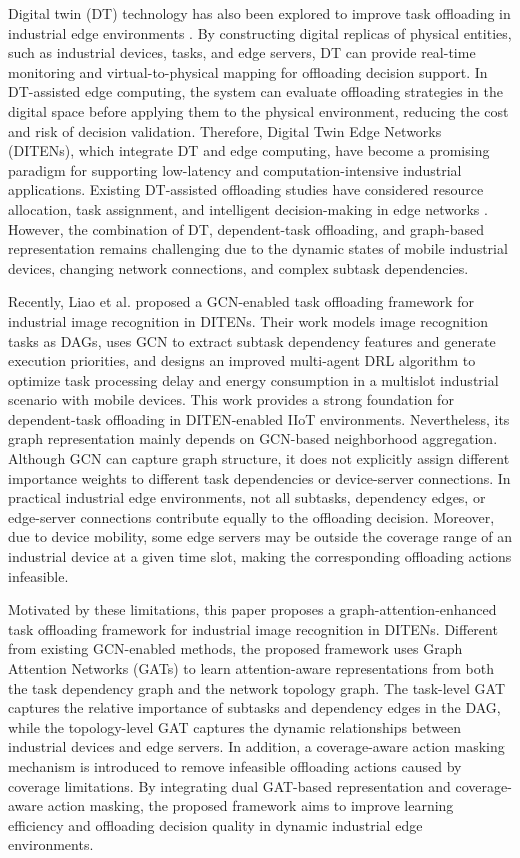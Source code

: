 \documentclass[conference]{IEEEtran}
\begin{document}
Digital twin (DT) technology has also been explored to improve task offloading in industrial edge environments \cite{10089851}. By constructing digital replicas of physical entities, such as industrial devices, tasks, and edge servers, DT can provide real-time monitoring and virtual-to-physical mapping for offloading decision support. In DT-assisted edge computing, the system can evaluate offloading strategies in the digital space before applying them to the physical environment, reducing the cost and risk of decision validation. Therefore, Digital Twin Edge Networks (DITENs), which integrate DT and edge computing, have become a promising paradigm for supporting low-latency and computation-intensive industrial applications. Existing DT-assisted offloading studies have considered resource allocation, task assignment, and intelligent decision-making in edge networks \cite{10680286,10062583}. However, the combination of DT, dependent-task offloading, and graph-based representation remains challenging due to the dynamic states of mobile industrial devices, changing network connections, and complex subtask dependencies.

Recently, Liao et al. \cite{10892268} proposed a GCN-enabled task offloading framework for industrial image recognition in DITENs. Their work models image recognition tasks as DAGs, uses GCN to extract subtask dependency features and generate execution priorities, and designs an improved multi-agent DRL algorithm to optimize task processing delay and energy consumption in a multislot industrial scenario with mobile devices. This work provides a strong foundation for dependent-task offloading in DITEN-enabled IIoT environments. Nevertheless, its graph representation mainly depends on GCN-based neighborhood aggregation. Although GCN can capture graph structure, it does not explicitly assign different importance weights to different task dependencies or device-server connections. In practical industrial edge environments, not all subtasks, dependency edges, or edge-server connections contribute equally to the offloading decision. Moreover, due to device mobility, some edge servers may be outside the coverage range of an industrial device at a given time slot, making the corresponding offloading actions infeasible.

Motivated by these limitations, this paper proposes a graph-attention-enhanced task offloading framework for industrial image recognition in DITENs. Different from existing GCN-enabled methods, the proposed framework uses Graph Attention Networks (GATs) to learn attention-aware representations from both the task dependency graph and the network topology graph. The task-level GAT captures the relative importance of subtasks and dependency edges in the DAG, while the topology-level GAT captures the dynamic relationships between industrial devices and edge servers. In addition, a coverage-aware action masking mechanism is introduced to remove infeasible offloading actions caused by coverage limitations. By integrating dual GAT-based representation and coverage-aware action masking, the proposed framework aims to improve learning efficiency and offloading decision quality in dynamic industrial edge environments.
\end{document}
